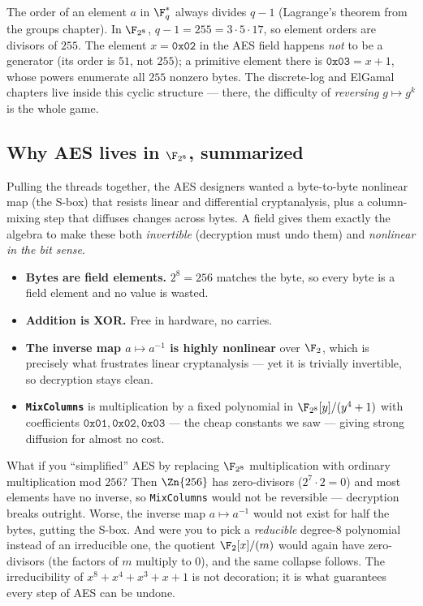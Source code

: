 \begin{connectionbox}
The order of an element $a$ in $\F_q^{*}$ always divides $q-1$ (Lagrange's
theorem from the groups chapter). In $\F_{2^8}$, $q-1 = 255 = 3 \cdot 5 \cdot
17$, so element orders are divisors of $255$. The element $x = \texttt{0x02}$
in the AES field happens \emph{not} to be a generator (its order is $51$, not
$255$); a primitive element there is $\texttt{0x03} = x+1$, whose powers
enumerate all $255$ nonzero bytes. The discrete-log and ElGamal chapters live
inside this cyclic structure --- there, the difficulty of \emph{reversing}
$g \mapsto g^k$ is the whole game.
\end{connectionbox}

\subsection{Why AES lives in $\F_{2^8}$, summarized}
\label{ch06:why-aes}

Pulling the threads together, the AES designers wanted a byte-to-byte
nonlinear map (the S-box) that resists linear and differential cryptanalysis,
plus a column-mixing step that diffuses changes across bytes. A field gives
them exactly the algebra to make these both \emph{invertible} (decryption
must undo them) and \emph{nonlinear in the bit sense}.

\begin{itemize}
  \item \textbf{Bytes are field elements.} $2^8 = 256$ matches the byte, so
        every byte is a field element and no value is wasted.
  \item \textbf{Addition is XOR.} Free in hardware, no carries.
  \item \textbf{The inverse map $a \mapsto a^{-1}$ is highly nonlinear} over
        $\F_2$, which is precisely what frustrates linear cryptanalysis ---
        yet it is trivially invertible, so decryption stays clean.
  \item \textbf{\texttt{MixColumns}} is multiplication by a fixed polynomial
        in $\F_{2^8}[y]/(y^4+1)$ with coefficients $\texttt{0x01},
        \texttt{0x02}, \texttt{0x03}$ --- the cheap constants we saw ---
        giving strong diffusion for almost no cost.
\end{itemize}

\begin{attackbox}
What if you ``simplified'' AES by replacing $\F_{2^8}$ multiplication with
ordinary multiplication mod $256$? Then $\Zn{256}$ has zero-divisors
($2^7 \cdot 2 = 0$) and most elements have no inverse, so \texttt{MixColumns}
would not be reversible --- decryption breaks outright. Worse, the inverse
map $a\mapsto a^{-1}$ would not exist for half the bytes, gutting the S-box.
And were you to pick a \emph{reducible} degree-8 polynomial instead of an
irreducible one, the quotient $\F_2[x]/(m)$ would again have zero-divisors
(the factors of $m$ multiply to $0$), and the same collapse follows. The
irreducibility of $x^8+x^4+x^3+x+1$ is not decoration; it is what guarantees
every step of AES can be undone.
\end{attackbox}

